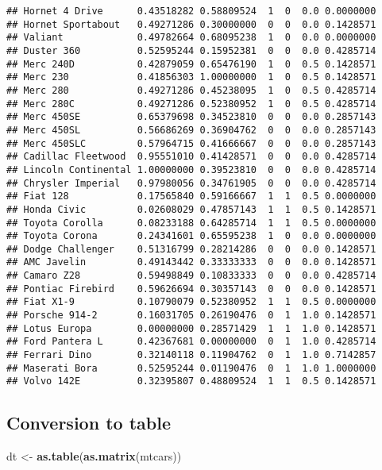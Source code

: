 \documentclass[]{article}
\newenvironment{Shaded}{\begin{snugshade}}{\end{snugshade}}
\newcommand{\KeywordTok}[1]{\textcolor[rgb]{0.13,0.29,0.53}{\textbf{#1}}}
\newcommand{\StringTok}[1]{\textcolor[rgb]{0.31,0.60,0.02}{#1}}
\newcommand{\NormalTok}[1]{#1}
\begin{document}
\begin{verbatim}
## Hornet 4 Drive      0.43518282 0.58809524  1  0  0.0 0.0000000
## Hornet Sportabout   0.49271286 0.30000000  0  0  0.0 0.1428571
## Valiant             0.49782664 0.68095238  1  0  0.0 0.0000000
## Duster 360          0.52595244 0.15952381  0  0  0.0 0.4285714
## Merc 240D           0.42879059 0.65476190  1  0  0.5 0.1428571
## Merc 230            0.41856303 1.00000000  1  0  0.5 0.1428571
## Merc 280            0.49271286 0.45238095  1  0  0.5 0.4285714
## Merc 280C           0.49271286 0.52380952  1  0  0.5 0.4285714
## Merc 450SE          0.65379698 0.34523810  0  0  0.0 0.2857143
## Merc 450SL          0.56686269 0.36904762  0  0  0.0 0.2857143
## Merc 450SLC         0.57964715 0.41666667  0  0  0.0 0.2857143
## Cadillac Fleetwood  0.95551010 0.41428571  0  0  0.0 0.4285714
## Lincoln Continental 1.00000000 0.39523810  0  0  0.0 0.4285714
## Chrysler Imperial   0.97980056 0.34761905  0  0  0.0 0.4285714
## Fiat 128            0.17565840 0.59166667  1  1  0.5 0.0000000
## Honda Civic         0.02608029 0.47857143  1  1  0.5 0.1428571
## Toyota Corolla      0.08233188 0.64285714  1  1  0.5 0.0000000
## Toyota Corona       0.24341601 0.65595238  1  0  0.0 0.0000000
## Dodge Challenger    0.51316799 0.28214286  0  0  0.0 0.1428571
## AMC Javelin         0.49143442 0.33333333  0  0  0.0 0.1428571
## Camaro Z28          0.59498849 0.10833333  0  0  0.0 0.4285714
## Pontiac Firebird    0.59626694 0.30357143  0  0  0.0 0.1428571
## Fiat X1-9           0.10790079 0.52380952  1  1  0.5 0.0000000
## Porsche 914-2       0.16031705 0.26190476  0  1  1.0 0.1428571
## Lotus Europa        0.00000000 0.28571429  1  1  1.0 0.1428571
## Ford Pantera L      0.42367681 0.00000000  0  1  1.0 0.4285714
## Ferrari Dino        0.32140118 0.11904762  0  1  1.0 0.7142857
## Maserati Bora       0.52595244 0.01190476  0  1  1.0 1.0000000
## Volvo 142E          0.32395807 0.48809524  1  1  0.5 0.1428571
\end{verbatim}

\subsection{Conversion to table}\label{conversion-to-table}

\begin{Shaded}
\begin{Highlighting}[]
\NormalTok{dt <-}\StringTok{ }\KeywordTok{as.table}\NormalTok{(}\KeywordTok{as.matrix}\NormalTok{(mtcars))   }
\end{Highlighting}
\end{Shaded}
\end{document}
